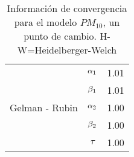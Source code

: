 \begin{table}[!h]
\begin{tabular}{|l|c|l|l|l|l|l|}
\multirow{5}{2.5cm}{Gelman - Rubin} & $\alpha_1$ & \multicolumn{5}{|c|}{1.01}\\ \cline{2-7}
&$\beta_1$ &  \multicolumn{5}{|c|}{1.01} \\ \cline{2-7}
&$\alpha_2$ &  \multicolumn{5}{|c|}{1.00} \\ \cline{2-7}
&$\beta_2$ &  \multicolumn{5}{|c|}{1.00} \\ \cline{2-7}
&$\tau$ &  \multicolumn{5}{|c|}{1.00} \\ \cline{1-7}



\end{tabular}
\caption{Información de convergencia para el modelo $PM_{10}$, un punto de cambio. H-W=Heidelberger-Welch}
\label{convergencia_updc_pm10}
\end{table}




